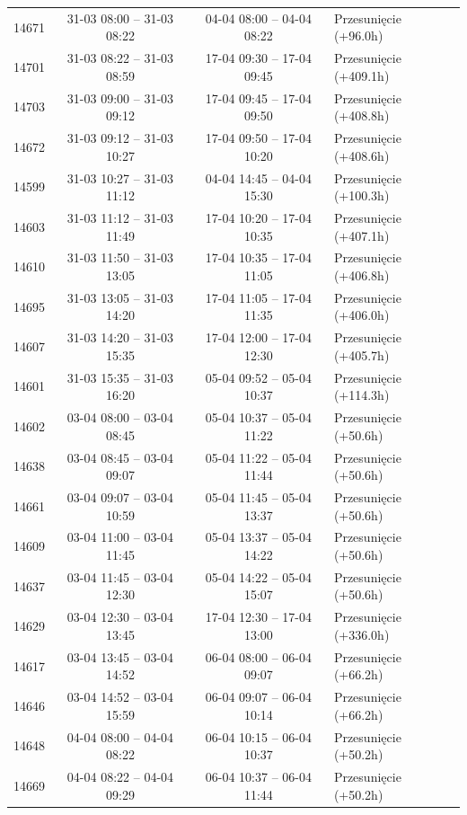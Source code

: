 \begin{table}[htbp]
\begin{tabular}{|r|c|c|l|}
14671 & 31-03 08:00 -- 31-03 08:22 & 04-04 08:00 -- 04-04 08:22 & Przesunięcie (+96.0h) \\ 
14701 & 31-03 08:22 -- 31-03 08:59 & 17-04 09:30 -- 17-04 09:45 & Przesunięcie (+409.1h) \\ 
14703 & 31-03 09:00 -- 31-03 09:12 & 17-04 09:45 -- 17-04 09:50 & Przesunięcie (+408.8h) \\ 
14672 & 31-03 09:12 -- 31-03 10:27 & 17-04 09:50 -- 17-04 10:20 & Przesunięcie (+408.6h) \\ 
14599 & 31-03 10:27 -- 31-03 11:12 & 04-04 14:45 -- 04-04 15:30 & Przesunięcie (+100.3h) \\ 
14603 & 31-03 11:12 -- 31-03 11:49 & 17-04 10:20 -- 17-04 10:35 & Przesunięcie (+407.1h) \\ 
14610 & 31-03 11:50 -- 31-03 13:05 & 17-04 10:35 -- 17-04 11:05 & Przesunięcie (+406.8h) \\ 
14695 & 31-03 13:05 -- 31-03 14:20 & 17-04 11:05 -- 17-04 11:35 & Przesunięcie (+406.0h) \\ 
14607 & 31-03 14:20 -- 31-03 15:35 & 17-04 12:00 -- 17-04 12:30 & Przesunięcie (+405.7h) \\ 
14601 & 31-03 15:35 -- 31-03 16:20 & 05-04 09:52 -- 05-04 10:37 & Przesunięcie (+114.3h) \\ 
14602 & 03-04 08:00 -- 03-04 08:45 & 05-04 10:37 -- 05-04 11:22 & Przesunięcie (+50.6h) \\ 
14638 & 03-04 08:45 -- 03-04 09:07 & 05-04 11:22 -- 05-04 11:44 & Przesunięcie (+50.6h) \\ 
14661 & 03-04 09:07 -- 03-04 10:59 & 05-04 11:45 -- 05-04 13:37 & Przesunięcie (+50.6h) \\ 
14609 & 03-04 11:00 -- 03-04 11:45 & 05-04 13:37 -- 05-04 14:22 & Przesunięcie (+50.6h) \\ 
14637 & 03-04 11:45 -- 03-04 12:30 & 05-04 14:22 -- 05-04 15:07 & Przesunięcie (+50.6h) \\ 
14629 & 03-04 12:30 -- 03-04 13:45 & 17-04 12:30 -- 17-04 13:00 & Przesunięcie (+336.0h) \\ 
14617 & 03-04 13:45 -- 03-04 14:52 & 06-04 08:00 -- 06-04 09:07 & Przesunięcie (+66.2h) \\ 
14646 & 03-04 14:52 -- 03-04 15:59 & 06-04 09:07 -- 06-04 10:14 & Przesunięcie (+66.2h) \\ 
14648 & 04-04 08:00 -- 04-04 08:22 & 06-04 10:15 -- 06-04 10:37 & Przesunięcie (+50.2h) \\ 
14669 & 04-04 08:22 -- 04-04 09:29 & 06-04 10:37 -- 06-04 11:44 & Przesunięcie (+50.2h) \\ 

\end{tabular}
\end{table}
